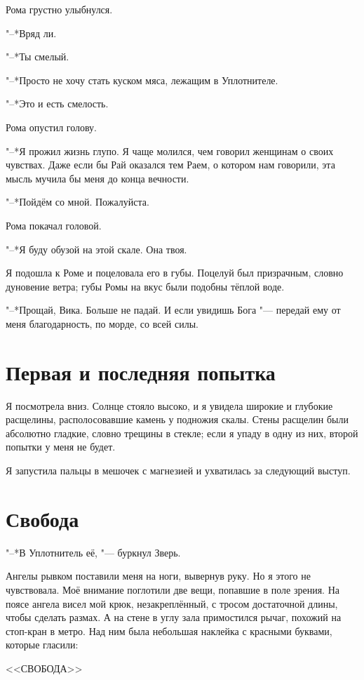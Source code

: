 Рома грустно улыбнулся.

"--*Вряд ли.

"--*Ты смелый.

"--*Просто не хочу стать куском мяса, лежащим в Уплотнителе.

"--*Это и есть смелость.

Рома опустил голову.

"--*Я прожил жизнь глупо.
Я чаще молился, чем говорил женщинам о своих чувствах.
Даже если бы Рай оказался тем Раем, о котором нам говорили, эта мысль мучила бы меня до конца вечности.

"--*Пойдём со мной.
Пожалуйста.

Рома покачал головой.

"--*Я буду обузой на этой скале.
Она твоя.

Я подошла к Роме и поцеловала его в губы.
Поцелуй был призрачным, словно дуновение ветра;
губы Ромы на вкус были подобны тёплой воде.

"--*Прощай, Вика.
Больше не падай.
И если увидишь Бога "--- передай ему от меня благодарность, по морде, со всей силы.

\section{Первая и последняя попытка}

Я посмотрела вниз.
Солнце стояло высоко, и я увидела широкие и глубокие расщелины, располосовавшие камень у подножия скалы.
Стены расщелин были абсолютно гладкие, словно трещины в стекле;
если я упаду в одну из них, второй попытки у меня не будет.

Я запустила пальцы в мешочек с магнезией и ухватилась за следующий выступ.

\section{Свобода}

"--*В Уплотнитель её, "--- буркнул Зверь.

Ангелы рывком поставили меня на ноги, вывернув руку.
Но я этого не чувствовала.
Моё внимание поглотили две вещи, попавшие в поле зрения.
На поясе ангела висел мой крюк, незакреплённый, с тросом достаточной длины, чтобы сделать размах.
А на стене в углу зала примостился рычаг, похожий на стоп-кран в метро.
Над ним была небольшая наклейка с красными буквами, которые гласили:

<<СВОБОДА>>

